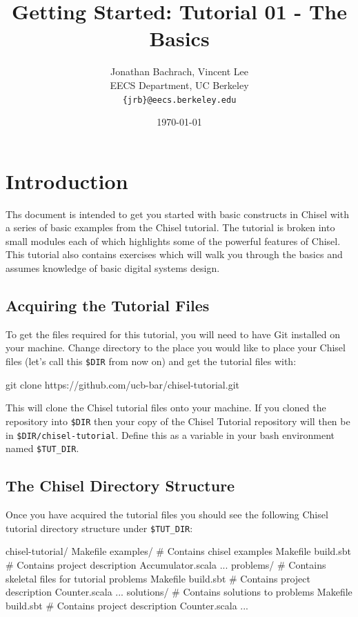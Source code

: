 \documentclass[twocolumn, 10pt]{article}
\title{Getting Started: Tutorial 01 - The Basics}
\author{Jonathan Bachrach, Vincent Lee \\
EECS Department, UC Berkeley\\
{\tt  \{jrb\}@eecs.berkeley.edu}
}
\date{\today}
\begin{document}
\maketitle{}

\section{Introduction}

Ths document is intended to get you started with basic constructs in Chisel with a series of basic examples from the Chisel tutorial.  The tutorial is broken into small modules each of which highlights some of the powerful features of Chisel. This tutorial also contains exercises which will walk you through the basics and assumes knowledge of basic digital systems design.

\subsection{Acquiring the Tutorial Files}

To get the files required for this tutorial, you will need to have Git installed on your machine. Change directory to the place you would like to place your Chisel files (let's call this \verb+$DIR+ from now on) and get the tutorial files with:

\begin{bash}
git clone https://github.com/ucb-bar/chisel-tutorial.git
\end{bash}

This will clone the Chisel tutorial files onto your machine. If you cloned the repository into \verb+$DIR+ then your copy of the Chisel Tutorial repository will then be in \verb+$DIR/chisel-tutorial+.  Define this as a variable in your bash environment named \verb+$TUT_DIR+.

\subsection{The Chisel Directory Structure}

Once you have acquired the tutorial files you should see the following Chisel tutorial directory structure under \verb+$TUT_DIR+:

\begin{bash}
chisel-tutorial/  
  Makefile
  examples/   # Contains chisel examples
    Makefile  
    build.sbt # Contains project description
    Accumulator.scala ...
  problems/   # Contains skeletal files for tutorial problems
    Makefile
    build.sbt # Contains project description
    Counter.scala ...
  solutions/  # Contains solutions to problems
    Makefile
    build.sbt # Contains project description
    Counter.scala ...
\end{bash}
\end{document}
